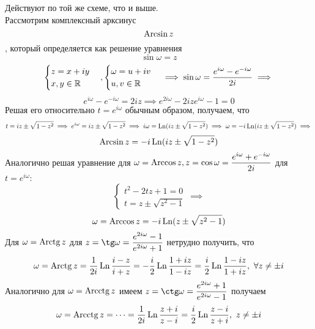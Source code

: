 \documentclass[../../main.tex]{subfiles}
\begin{document}
Действуют по той же схеме, что и выше.\\
Рассмотрим комплексный арксинус
\begin{equation}
\label{lec27:23}
\operatorname{Arcsin} z
\end{equation}, который определяется как решение уравнения
\begin{equation}
\label{lec27:24}
\sin \omega = z
\end{equation}
\[
\begin{cases}
	z = x + iy\\
	x, y \in \mathbb{R}
\end{cases},
\begin{cases}
	\omega = u + iv\\
	u, v \in \mathbb{R}
\end{cases} \implies
\sin \omega = \dfrac{e^{i\omega} - e^{-i\omega}}{2i} \implies\]\[
e^{i\omega} - e^{-i\omega} = 2iz \implies
e^{2i\omega} - 2ize^{i\omega} - 1 = 0
\]
Решая его относительно $ t = e^{i\omega} $ обычным образом, получаем, что
\[
t = iz \pm \sqrt{1 - z^2} \implies
e^{i\omega} = iz \pm \sqrt{1 - z^2} \implies
i\omega = \operatorname{Ln}(iz \pm \sqrt{1 - z^2}) \implies
\omega = -i\operatorname{Ln}(iz \pm \sqrt{1 - z^2}) \implies
\]
\begin{equation}
\label{lec27:25}
\operatorname{Arcsin} z = -i\operatorname{Ln}(iz\pm\sqrt{1 - z^2})
\end{equation}
Аналогично решая уравнение для $ \omega = \operatorname{Arccos} z, z = \cos \omega = 
\dfrac{e^{i\omega} + e^{-i\omega}}{2i} $ для $ t = e^{i\omega} $:
\[
\begin{cases}
	t^2 - 2tz + 1 = 0 \\
	t = z \pm \sqrt{z^2 - 1}
\end{cases} \implies
\] 
\begin{equation}
\label{lec27:26}
\omega = \operatorname{Arccos} z = -i\operatorname{Ln}(z \pm \sqrt{z^2 - 1})
\end{equation}
Для $ \omega = \operatorname{Arctg} z $ для $ z = \tg \omega = 
\dfrac{e^{2i\omega} - 1}{e^{2i\omega} + 1} $ нетрудно получить, что 
\begin{equation}
\label{lec27:27}
\omega = \operatorname{Arctg} z = \dfrac{1}{2i} \operatorname{Ln} \dfrac{i - z}{i + z} = 
-\dfrac{i}{2} \operatorname{Ln}\dfrac{1 + iz}{1 - iz} = 
\dfrac{i}{2} \operatorname{Ln}\dfrac{1 - iz}{1 + iz},\ \forall z \neq \pm i
\end{equation}
Аналогично для $ \omega = \operatorname{Arcctg} z $ имеем $ z = \ctg \omega = 
\dfrac{e^{2i\omega} + 1}{e^{2i\omega} - 1} $ получаем
\begin{equation}
\label{lec27:28}
\omega = \operatorname{Arcctg} z = \dots = \dfrac{1}{2i} \operatorname{Ln} \dfrac{z + i}{z - i} = 
\dfrac{i}{2} \operatorname{Ln} \dfrac{z - i}{z + i},\ z \neq \pm i
\end{equation}
\end{document}
